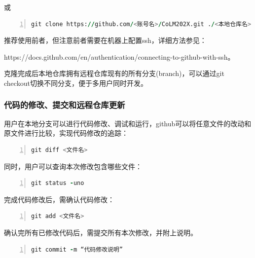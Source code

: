 或
\begin{lstlisting}[language=fortran, basicstyle=\linespread{1.0}\footnotesize\ttfamily, commentstyle=\color{olive}, numbers=left, numberstyle=\tiny, xleftmargin=1.5em,xrightmargin=0em, aboveskip=1em]
    git clone https://github.com/<账号名>/CoLM202X.git ./<本地仓库名>
\end{lstlisting}


推荐使用前者，但注意前者需要在机器上配置ssh，详细方法参见：

https://docs.github.com/en/authentication/connecting-to-github-with-ssh。

克隆完成后本地仓库拥有远程仓库现有的所有分支(branch)，可以通过git checkout切换不同分支，便于多用户同时开发。

\subsubsection{代码的修改、提交和远程仓库更新}

用户在本地分支可以进行代码修改、调试和运行，github可以将任意文件的改动和原文件进行比较，实现代码修改的追踪：

\begin{lstlisting}[language=fortran, basicstyle=\linespread{1.0}\footnotesize\ttfamily, commentstyle=\color{olive}, numbers=left, numberstyle=\tiny, xleftmargin=1.5em,xrightmargin=0em, aboveskip=1em]
   git diff <文件名>
\end{lstlisting}



同时，用户可以查询本次修改包含哪些文件：

\begin{lstlisting}[language=fortran, basicstyle=\linespread{1.0}\footnotesize\ttfamily, commentstyle=\color{olive}, numbers=left, numberstyle=\tiny, xleftmargin=1.5em,xrightmargin=0em, aboveskip=1em]
   git status -uno
\end{lstlisting}

完成代码修改后，需确认代码修改：

\begin{lstlisting}[language=fortran, basicstyle=\linespread{1.0}\footnotesize\ttfamily, commentstyle=\color{olive}, numbers=left, numberstyle=\tiny, xleftmargin=1.5em,xrightmargin=0em, aboveskip=1em]
   git add <文件名>
\end{lstlisting}

确认完所有已修改代码后，需提交所有本次修改，并附上说明。

\begin{lstlisting}[language=fortran, basicstyle=\linespread{1.0}\footnotesize\ttfamily, commentstyle=\color{olive}, numbers=left, numberstyle=\tiny, xleftmargin=1.5em,xrightmargin=0em, aboveskip=1em]
   git commit -m “代码修改说明”
\end{lstlisting}

